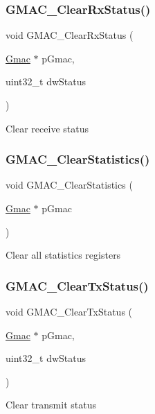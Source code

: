 \subsubsection{\texorpdfstring{GMAC\_ClearRxStatus()}{GMAC\_ClearRxStatus()}}
{\footnotesize\ttfamily void G\+M\+A\+C\+\_\+\+Clear\+Rx\+Status (\begin{DoxyParamCaption}\item[{\mbox{\hyperlink{structGmac}{Gmac}} $\ast$}]{p\+Gmac,  }\item[{uint32\+\_\+t}]{dw\+Status }\end{DoxyParamCaption})}

Clear receive status \mbox{\label{group__gmac__defines_ga9ae76d6d8ceef0dafbe72bb34864bc65}} 
\subsubsection{\texorpdfstring{GMAC\_ClearStatistics()}{GMAC\_ClearStatistics()}}
{\footnotesize\ttfamily void G\+M\+A\+C\+\_\+\+Clear\+Statistics (\begin{DoxyParamCaption}\item[{\mbox{\hyperlink{structGmac}{Gmac}} $\ast$}]{p\+Gmac }\end{DoxyParamCaption})}

Clear all statistics registers \mbox{\label{group__gmac__defines_ga620df07c4598d12a88be4e3715eafe7e}} 
\subsubsection{\texorpdfstring{GMAC\_ClearTxStatus()}{GMAC\_ClearTxStatus()}}
{\footnotesize\ttfamily void G\+M\+A\+C\+\_\+\+Clear\+Tx\+Status (\begin{DoxyParamCaption}\item[{\mbox{\hyperlink{structGmac}{Gmac}} $\ast$}]{p\+Gmac,  }\item[{uint32\+\_\+t}]{dw\+Status }\end{DoxyParamCaption})}

Clear transmit status \mbox{\label{group__gmac__defines_ga6939e2e68cc4b238caeab75414dd62b9}} 
